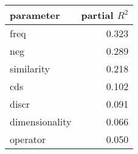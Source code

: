\begin{tabular}{lr}
\toprule
      parameter &  partial $R^2$ \\
\midrule
           freq &      0.323 \\
            neg &      0.289 \\
     similarity &      0.218 \\
            cds &      0.102 \\
          discr &      0.091 \\
 dimensionality &      0.066 \\
       operator &      0.050 \\
\bottomrule
\end{tabular}
